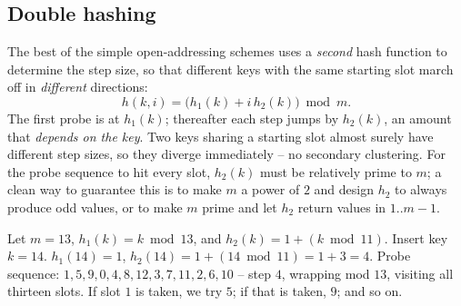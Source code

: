 \subsection{Double hashing}

The best of the simple open-addressing schemes uses a \emph{second} hash function to determine the step size, so that different keys with the same starting slot march off in \emph{different} directions:
\[
  h(k,i) = \big(h_1(k) + i\,h_2(k)\big) \bmod m.
\]
The first probe is at $h_1(k)$; thereafter each step jumps by $h_2(k)$, an amount that \emph{depends on the key}. Two keys sharing a starting slot almost surely have different step sizes, so they diverge immediately -- no secondary clustering. For the probe sequence to hit every slot, $h_2(k)$ must be relatively prime to $m$; a clean way to guarantee this is to make $m$ a power of $2$ and design $h_2$ to always produce odd values, or to make $m$ prime and let $h_2$ return values in $1..m-1$.

\begin{example}
Let $m = 13$, $h_1(k) = k \bmod 13$, and $h_2(k) = 1 + (k \bmod 11)$. Insert key $k = 14$.
$h_1(14) = 1$, $h_2(14) = 1 + (14 \bmod 11) = 1 + 3 = 4$. Probe sequence: $1, 5, 9, 0, 4, 8, 12, 3, 7, 11, 2, 6, 10$ -- step $4$, wrapping mod $13$, visiting all thirteen slots. If slot $1$ is taken, we try $5$; if that is taken, $9$; and so on.
\end{example}

